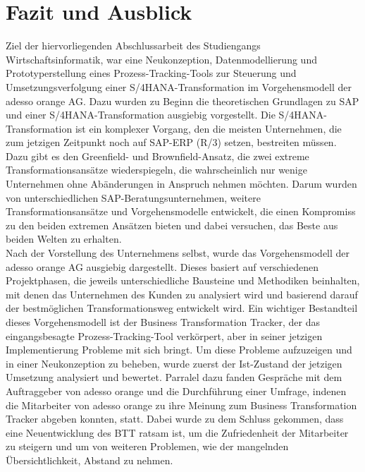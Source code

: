\section{Fazit und Ausblick}
Ziel der hiervorliegenden Abschlussarbeit des Studiengangs Wirtschaftsinformatik, war eine Neukonzeption, Datenmodellierung und Prototyperstellung eines Prozess-Tracking-Tools zur Steuerung und Umsetzungsverfolgung einer S/4HANA-Transformation im Vorgehensmodell der adesso orange AG. Dazu wurden zu Beginn die theoretischen Grundlagen zu SAP und einer S/4HANA-Transformation ausgiebig vorgestellt. Die S/4HANA-Transformation ist ein komplexer Vorgang, den die meisten Unternehmen, die zum jetzigen Zeitpunkt noch auf SAP-ERP (R/3) setzen, bestreiten müssen. Dazu gibt es den Greenfield- und Brownfield-Ansatz, die zwei extreme Transformationsansätze wiederspiegeln, die wahrscheinlich nur wenige Unternehmen ohne Abänderungen in Anspruch nehmen möchten. Darum wurden von unterschiedlichen SAP-Beratungsunternehmen, weitere Transformationsansätze und Vorgehensmodelle entwickelt, die einen Kompromiss zu den beiden extremen Ansätzen bieten und dabei versuchen, das \glqq{}Beste aus beiden Welten\grqq{} zu erhalten.\\Nach der Vorstellung des Unternehmens selbst, wurde das Vorgehensmodell der adesso orange AG ausgiebig dargestellt. Dieses basiert auf verschiedenen Projektphasen, die jeweils unterschiedliche Bausteine und Methodiken beinhalten, mit denen das Unternehmen des Kunden zu analysiert wird und basierend darauf der bestmöglichen Transformationsweg entwickelt wird. Ein wichtiger Bestandteil dieses Vorgehensmodell ist der Business Transformation Tracker, der das eingangsbesagte Prozess-Tracking-Tool verkörpert, aber in seiner jetzigen Implementierung Probleme mit sich bringt. Um diese Probleme aufzuzeigen und in einer Neukonzeption zu beheben, wurde zuerst der Ist-Zustand der jetzigen Umsetzung analysiert und bewertet. Parralel dazu fanden Gespräche mit dem Auftraggeber von adesso orange und die Durchführung einer Umfrage, indenen die Mitarbeiter von adesso orange zu ihre Meinung zum Business Transformation Tracker abgeben konnten, statt. Dabei wurde zu dem Schluss gekommen, dass eine Neuentwicklung des BTT ratsam ist, um die Zufriedenheit der Mitarbeiter zu steigern und um von weiteren Problemen, wie der mangelnden Übersichtlichkeit, Abstand zu nehmen. 
